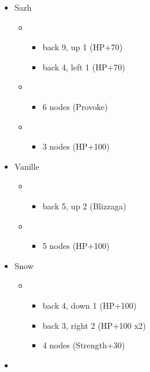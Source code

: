 \begin{menu}
	\begin{itemize}
	\crystarium
		\begin{itemize}
			\item Sazh
				\begin{itemize}
					\item \com
						\begin{itemize}
							\item back 9, up 1 (HP+70)
							\item back 4, left 1 (HP+70)
						\end{itemize}
					\item \sen
						\begin{itemize}
							\item 6 nodes (Provoke)
						\end{itemize}
					\item \syn
						\begin{itemize}
							\item 3 nodes (HP+100)
						\end{itemize}
				\end{itemize}
			\item Vanille
				\begin{itemize}
					\item \rav
						\begin{itemize}
							\item back 5, up 2 (Blizzaga)
						\end{itemize}
					\item \sab
						\begin{itemize}
							\item 5 nodes (HP+100)
						\end{itemize}
				\end{itemize}
			\item Snow
				\begin{itemize}
					\item \com
						\begin{itemize}
							\item back 4, down 1 (HP+100)
							\item back 3, right 2 (HP+100 x2)
							\item 4 nodes (Strength+30)
						\end{itemize}
				\end{itemize}
		\end{itemize}
		\paradigm
		\begin{itemize}
			\item \paradigmdeck{%
}
\end{itemize}
\end{itemize}
\end{menu}
